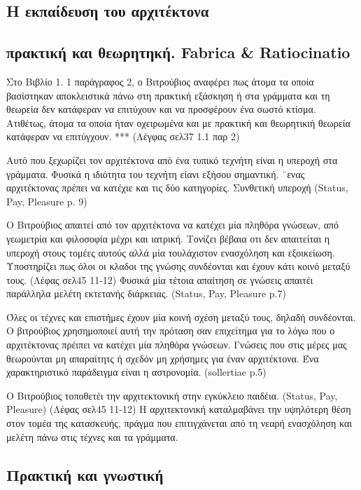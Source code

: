 \subsection{Η εκπαίδευση του αρχιτέκτονα}
 
\subsection{πρακτική και θεωρητηκή. Fabrica \& Ratiocinatio}
 
 Στο Βιβλίο 1. 1 παράγραφος 2, ο Βιτρούβιος αναφέρει πως άτομα τα οποία βασίστηκαν αποκλειστικά πάνω στη πρακτική εξάσκηση ή  στα γράμματα και τη θεωρεία δεν κατάφεραν να επιτύχουν και να προσφέρουν ένα σωστό κτίσμα. Ατιθέτως, άτομα τα οποία ήταν οχειρωμένα και με πρακτική και θεωρητικιή θεωρεία κατάφεραν να επιτύγχουν. *** (Λέγφας σελ37 1.1 παρ 2)
 
 Αυτό που ξεχωρίζει τον αρχιτέκτονα από ένα τυπικό τεχνήτη είναι η υπεροχή στα γράμματα. Φυσικά η ιδιότητα του τεχνήτη είανι εξήσου σημαντική. ¨ενας αρχιτέκτονας πρέπει να κατέχιε και τις δύο κατηγορίες. Συνθετική υπεροχή (Status, Pay, Pleasure p. 9)
 
Ο Βιτρούβιος απαιτεί από τον αρχιτέκτονα να κατέχει μία πληθόρα γνώσεων, από γεωμετρία και φιλοσοφία μέχρι και ιατρική. Τονίζει βέβαια οτι δεν απαιτείται η υπεροχή στους τομέες αυτούς αλλά μία τουλάχιστον ενασχόληση και εξοικείωση. Υποστηρίζει πως όλοι οι κλαδοι της γνώσης συνδέονται και έχουν κάτι κοινό μεταξύ τους. (Λέφας σελ45 11-12)
Φυσικά μία τέτοια απαίτηση σε γνώσεις απαιτέι παράλληλα μελέτη εκτετανής διάρκειας. (Status, Pay, Pleasure p.7)

Όλες οι τέχνες και επιστήμες έχουν μία κοινή σχέση μεταξύ τους, δηλαδή συνδέονται. Ο βιτρούβιος χρησημοποιεί αυτή την πρόταση σαν επιχείτημα για το λόγω που ο αρχιτέκτονας πρέιπει να κατέχει μία πληθόρα γνώσεων. Γνώσεις που στις μέρες μας θεωρούνται μη απαραίτητς ή σχεδόν μη χρήσημες για έναν αρχιτέκτονα. Ένα χαρακτηριστικό παράδειγμα είναι η αστρονομία. (sollertiae p.5)

 Ο Βιτρούβιος τοποθετέι την αρχιτεκτονική στην εγκύκλειο παιδέια. (Status, Pay, Pleasure) (Λέφας σελ45 11-12)
 Η αρχιτεκτονική καταλμαβάνει την υψηλότερη θέση στον τομέα της κατασκευής, πράγμα που επιτιγχάνεται από τη νεαρή ενασχόληση και μελέτη πάνω στις τέχνες και τα γράμματα.
 
\subsection{Πρακτική και γνωστική}
 
